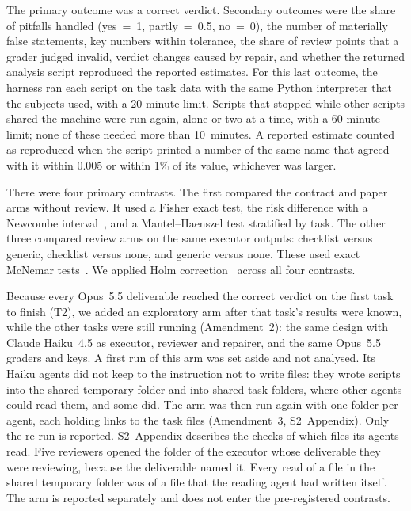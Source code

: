 The primary outcome was a correct verdict. Secondary outcomes were the
share of pitfalls handled (yes~=~1, partly~=~0.5, no~=~0), the number of
materially false statements, key numbers within tolerance, the share of
review points that a grader judged invalid, verdict changes caused by
repair, and whether the returned analysis script reproduced the reported
estimates. For this last outcome, the harness ran each script on the
task data with the same Python interpreter that the subjects used, with a
20-minute limit. Scripts that stopped while other scripts shared the
machine were run again, alone or two at a time, with a 60-minute limit;
none of these needed more than 10~minutes. A reported estimate counted as
reproduced when the script printed a number of the same name that agreed
with it within 0.005 or within 1\% of its value, whichever was larger.

There were four primary contrasts. The first compared the contract and
paper arms without review. It used a Fisher exact test, the risk
difference with a Newcombe interval~\cite{newcombe1998interval}, and a
Mantel--Haenszel test stratified by task. The other three compared review
arms on the same executor outputs: checklist versus generic, checklist
versus none, and generic versus none. These used exact McNemar
tests~\cite{mcnemar1947note}. We applied Holm
correction~\cite{holm1979simple} across all four contrasts.

Because every Opus~5.5 deliverable reached the correct verdict on the
first task to finish (T2), we added an exploratory arm after that task's
results were known, while the other tasks were still running
(Amendment~2): the same design with Claude Haiku~4.5 as executor, reviewer
and repairer, and the same Opus~5.5 graders and keys. A first run of this
arm was set aside and not analysed. Its Haiku agents did not keep to the
instruction not to write files: they wrote scripts into the shared
temporary folder and into shared task folders, where other agents could
read them, and some did. The arm was then run again with one folder per agent, each holding
links to the task files (Amendment~3, S2~Appendix). Only the re-run is
reported. S2~Appendix describes the checks of which files its agents
read. Five reviewers opened the folder of the executor whose deliverable
they were reviewing, because the deliverable named it. Every read of a
file in the shared temporary folder was of a file that the reading agent
had written itself. The arm is reported separately and does not enter the
pre-registered contrasts.

